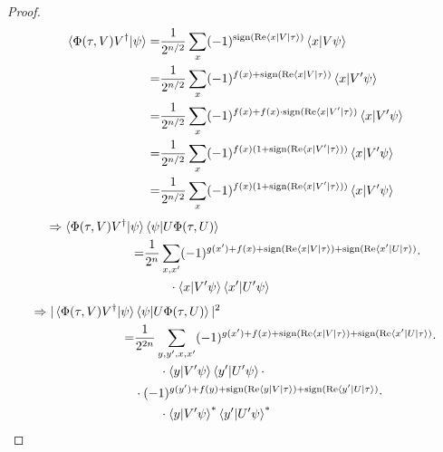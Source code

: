 \documentclass[manuscript,screen,review]{acmart}
\begin{document}
\begin{proof}
 
  \begin{equation*}
    \begin{split}
       \braket{\Phi(\tau,V) V^{\dagger}|\psi} = & \frac{1}{2^{n/2}}\sum_{x} (-1)^{\operatorname{sign}( \operatorname{Re} \braket{x|V|\tau})}\braket{x |V \psi} \\
       = & \frac{1}{2^{n/2}}\sum_{x} (-1)^{ f(x) + \operatorname{sign}( \operatorname{Re} \braket{x|V|\tau})}\braket{x |V^{\prime} \psi} \\  
       = & \frac{1}{2^{n/2}}\sum_{x} (-1)^{ f(x) +  f(x) \cdot \operatorname{sign}( \operatorname{Re} \braket{x|V^{\prime}|\tau})}\braket{x |V^{\prime} \psi} \\  
       = & \frac{1}{2^{n/2}}\sum_{x} (-1)^{ f(x) ( 1 +  \operatorname{sign}( \operatorname{Re} \braket{x|V^{\prime}|\tau}))}\braket{x |V^{\prime} \psi} \\  
       = & \frac{1}{2^{n/2}}\sum_{x} (-1)^{ f(x) ( 1 +  \operatorname{sign}( \operatorname{Re} \braket{x|V^{\prime}|\tau}))}\braket{x |V^{\prime} \psi} \\  
     \end{split}
   \end{equation*}
   \begin{equation*}
     \begin{split}
       \Rightarrow  \braket{\Phi(\tau,V) V^{\dagger}|\psi} & \braket{\psi|U\Phi(\tau,U) }  \\
       = & \frac{1}{2^{n}}\sum_{x,x^{\prime}} (-1)^{ g(x^{\prime})+f(x) + \operatorname{sign}( \operatorname{Re} \braket{x|V|\tau})+\operatorname{sign}( \operatorname{Re} \braket{x^{\prime}|U|\tau})} \cdot \\
       & \ \ \ \ \ \ \cdot  \braket{x |V^{\prime} \psi}\braket{x^{\prime} |U^{\prime} \psi} 
    \end{split}
  \end{equation*}
\begin{equation*}
     \begin{split}
       \Rightarrow  |\braket{\Phi(\tau,V) V^{\dagger}|\psi} & \braket{\psi|U\Phi(\tau,U) }|^2  \\
       = & \frac{1}{2^{2n}}\sum_{y,y^{\prime},x,x^{\prime}} (-1)^{ g(x^{\prime})+f(x) + \sign( \Rea \braket{x|V|\tau})+\sign( \Rea \braket{x^{\prime}|U|\tau})} \cdot \\
       & \ \ \ \ \ \ \cdot  \braket{y |V^{\prime} \psi}\braket{y^{\prime} |U^{\prime} \psi} \cdot  \\
  & \cdot (-1)^{ g(y^{\prime})+f(y) + \sign( \Rea \braket{y|V|\tau})+\sign( \Rea \braket{y^{\prime}|U|\tau})} \cdot \\
  & \ \ \ \ \ \ \cdot  \braket{y |V^{\prime} \psi}^{*}\braket{y^{\prime} |U^{\prime} \psi}^{*}

\end{split}
\end{equation*}
\end{proof}
\end{document}
